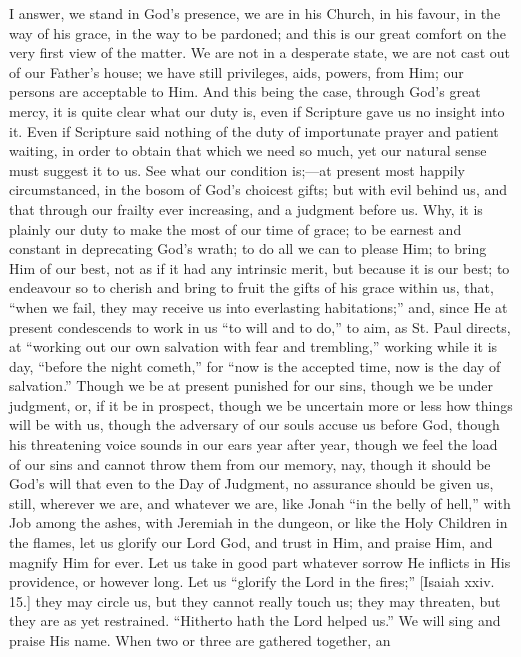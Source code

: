 I answer, we stand in God's presence, we are in his Church, in his
favour, in the way of his grace, in the way to be pardoned; and this
is our great comfort on the very first view of the matter. We are not
in a desperate state, we are not cast out of our Father's house; we
have still privileges, aids, powers, from Him; our persons are
acceptable to Him. And this being the case, through God's great mercy,
it is quite clear what our duty is, even if Scripture gave us no
insight into it. Even if Scripture said nothing of the duty of
importunate prayer and patient waiting, in order to obtain that which
we need so much, yet our natural sense must suggest it to us. See what
our condition is;—at present most happily circumstanced, in the
bosom of God's choicest gifts; but with evil behind us, and that
through our frailty ever increasing, and a judgment before us. Why, it
is plainly our duty to make the most of our time of grace; to be
earnest and constant in deprecating God's wrath; to do all we can to
please Him; to bring Him of our best, not as if it had any intrinsic
merit, but because it is our best; to endeavour so to cherish and
bring to fruit the gifts of his grace within us, that, ``when we
fail, they may receive us into everlasting habitations;'' and,
since He at present condescends to work in us ``to will and to
do,'' to aim, as St. Paul directs, at ``working out our own
salvation with fear and trembling,'' working while it is day,
``before the night cometh,'' for ``now is the accepted
time, now is the day of salvation.'' Though we be at present
punished for our sins, though we be under judgment, or, if it be in
prospect, though we be uncertain more or less how things will be with
us, though the adversary of our souls accuse us before God, though his
threatening voice sounds in our ears year after year, though we feel
the load of our sins and cannot throw them from our memory, nay,
though it should be God's will that even to the Day of Judgment, no
assurance should be given us, still, wherever we are, and whatever we
are, like Jonah ``in the belly of hell,'' with Job among the
ashes, with Jeremiah in the dungeon, or like the Holy Children in the
flames, let us glorify our Lord God, and trust in Him, and praise Him,
and magnify Him for ever. Let us take in good part whatever sorrow He
inflicts in His providence, or however long. Let us ``glorify the
Lord in the fires;'' [Isaiah xxiv. 15.] they may circle us, but
they cannot really touch us; they may threaten, but they are as yet
restrained. ``Hitherto hath the Lord helped us.'' We will sing
and praise His name. When two or three are gathered together, an
